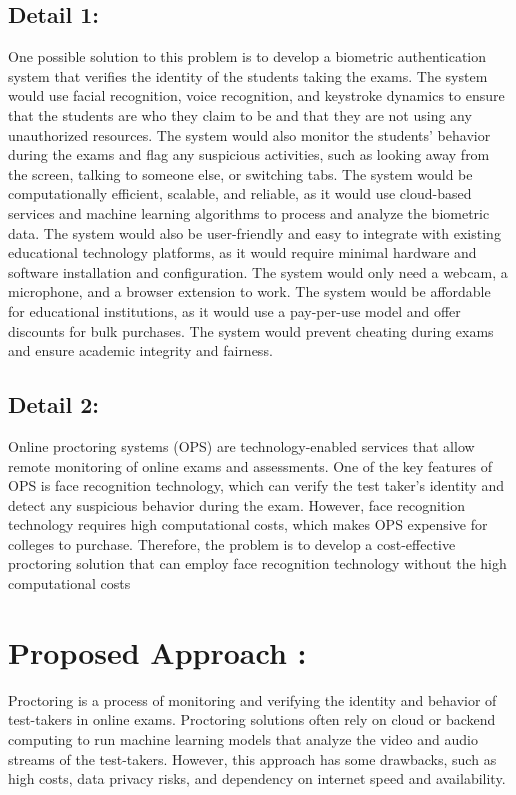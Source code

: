\documentclass[journal]{IEEEtran}
\begin{document}
\subsection{Detail 1:} 
One possible solution to this problem is to develop a biometric authentication system that verifies the identity of the students taking the exams. The system would use facial recognition, voice recognition, and keystroke dynamics to ensure that the students are who they claim to be and that they are not using any unauthorized resources. The system would also monitor the students' behavior during the exams and flag any suspicious activities, such as looking away from the screen, talking to someone else, or switching tabs. The system would be computationally efficient, scalable, and reliable, as it would use cloud-based services and machine learning algorithms to process and analyze the biometric data. The system would also be user-friendly and easy to integrate with existing educational technology platforms, as it would require minimal hardware and software installation and configuration. The system would only need a webcam, a microphone, and a browser extension to work. The system would be affordable for educational institutions, as it would use a pay-per-use model and offer discounts for bulk purchases. The system would prevent cheating during exams and ensure academic integrity and fairness.

\subsection{Detail 2:}
Online proctoring systems (OPS) are technology-enabled services that allow remote monitoring of online exams and assessments. One of the key features of OPS is face recognition technology, which can verify the test taker's identity and detect any suspicious behavior during the exam. However, face recognition technology requires high computational costs, which makes OPS expensive for colleges to purchase. Therefore, the problem is to develop a cost-effective proctoring solution that can employ face recognition technology without the high computational costs


\section{Proposed Approach : }
Proctoring is a process of monitoring and verifying the identity and behavior of test-takers in online exams. Proctoring solutions often rely on cloud or backend computing to run machine learning models that analyze the video and audio streams of the test-takers. However, this approach has some drawbacks, such as high costs, data privacy risks, and dependency on internet speed and availability.
\end{document}
